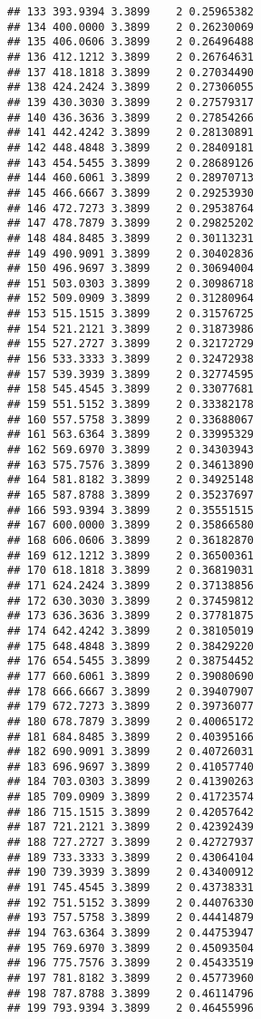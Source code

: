 \documentclass[
]{article}
\begin{document}
\begin{verbatim}
## 133 393.9394 3.3899    2 0.25965382
## 134 400.0000 3.3899    2 0.26230069
## 135 406.0606 3.3899    2 0.26496488
## 136 412.1212 3.3899    2 0.26764631
## 137 418.1818 3.3899    2 0.27034490
## 138 424.2424 3.3899    2 0.27306055
## 139 430.3030 3.3899    2 0.27579317
## 140 436.3636 3.3899    2 0.27854266
## 141 442.4242 3.3899    2 0.28130891
## 142 448.4848 3.3899    2 0.28409181
## 143 454.5455 3.3899    2 0.28689126
## 144 460.6061 3.3899    2 0.28970713
## 145 466.6667 3.3899    2 0.29253930
## 146 472.7273 3.3899    2 0.29538764
## 147 478.7879 3.3899    2 0.29825202
## 148 484.8485 3.3899    2 0.30113231
## 149 490.9091 3.3899    2 0.30402836
## 150 496.9697 3.3899    2 0.30694004
## 151 503.0303 3.3899    2 0.30986718
## 152 509.0909 3.3899    2 0.31280964
## 153 515.1515 3.3899    2 0.31576725
## 154 521.2121 3.3899    2 0.31873986
## 155 527.2727 3.3899    2 0.32172729
## 156 533.3333 3.3899    2 0.32472938
## 157 539.3939 3.3899    2 0.32774595
## 158 545.4545 3.3899    2 0.33077681
## 159 551.5152 3.3899    2 0.33382178
## 160 557.5758 3.3899    2 0.33688067
## 161 563.6364 3.3899    2 0.33995329
## 162 569.6970 3.3899    2 0.34303943
## 163 575.7576 3.3899    2 0.34613890
## 164 581.8182 3.3899    2 0.34925148
## 165 587.8788 3.3899    2 0.35237697
## 166 593.9394 3.3899    2 0.35551515
## 167 600.0000 3.3899    2 0.35866580
## 168 606.0606 3.3899    2 0.36182870
## 169 612.1212 3.3899    2 0.36500361
## 170 618.1818 3.3899    2 0.36819031
## 171 624.2424 3.3899    2 0.37138856
## 172 630.3030 3.3899    2 0.37459812
## 173 636.3636 3.3899    2 0.37781875
## 174 642.4242 3.3899    2 0.38105019
## 175 648.4848 3.3899    2 0.38429220
## 176 654.5455 3.3899    2 0.38754452
## 177 660.6061 3.3899    2 0.39080690
## 178 666.6667 3.3899    2 0.39407907
## 179 672.7273 3.3899    2 0.39736077
## 180 678.7879 3.3899    2 0.40065172
## 181 684.8485 3.3899    2 0.40395166
## 182 690.9091 3.3899    2 0.40726031
## 183 696.9697 3.3899    2 0.41057740
## 184 703.0303 3.3899    2 0.41390263
## 185 709.0909 3.3899    2 0.41723574
## 186 715.1515 3.3899    2 0.42057642
## 187 721.2121 3.3899    2 0.42392439
## 188 727.2727 3.3899    2 0.42727937
## 189 733.3333 3.3899    2 0.43064104
## 190 739.3939 3.3899    2 0.43400912
## 191 745.4545 3.3899    2 0.43738331
## 192 751.5152 3.3899    2 0.44076330
## 193 757.5758 3.3899    2 0.44414879
## 194 763.6364 3.3899    2 0.44753947
## 195 769.6970 3.3899    2 0.45093504
## 196 775.7576 3.3899    2 0.45433519
## 197 781.8182 3.3899    2 0.45773960
## 198 787.8788 3.3899    2 0.46114796
## 199 793.9394 3.3899    2 0.46455996

\end{verbatim}
\end{document}

